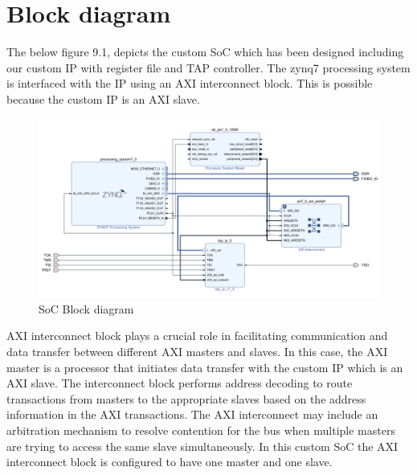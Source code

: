 
\section{Block diagram}
The below figure 9.1, depicts the custom SoC which has been designed including our custom IP with register file and TAP controller. The zynq7 processing system is interfaced with the IP using an AXI interconnect block. This is possible because the custom IP is an AXI slave.


\vspace{6mm}
\begin{figure}[h]
    \centering
    \includegraphics[width=1\linewidth]{Image/BD1.png}
    \caption{SoC Block diagram}
    \label{fig:enter-label}
\end{figure}


\vspace{6mm}
AXI interconnect block plays a crucial role in facilitating communication and data transfer between different AXI masters and slaves. In this case, the AXI master is a processor that initiates data transfer with the custom IP which is an AXI slave. The interconnect block performs address decoding to route transactions from masters to the appropriate slaves based on the address information in the AXI transactions. The AXI interconnect may include an arbitration mechanism to resolve contention for the bus when multiple masters are trying to access the same slave simultaneously. In this custom SoC the AXI interconnect block is configured to have one master and one slave.

